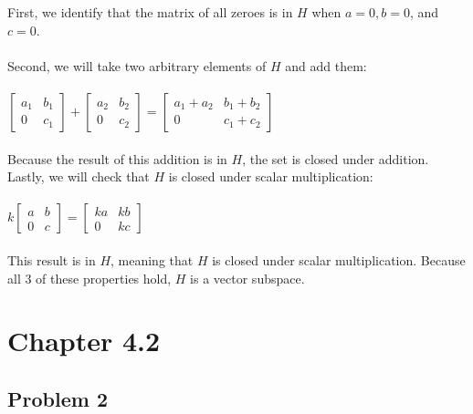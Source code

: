 \documentclass{article}%
\begin{document}
First, we identify that the matrix of all zeroes is in $H$ when $a = 0, b = 0$, and $c = 0$.\\
\\
Second, we will take two arbitrary elements of $H$ and add them:\\
\\
$
\begin{bmatrix}
    a_1 & b_1 \\
    0 & c_1
\end{bmatrix}
+
\begin{bmatrix}
    a_2 & b_2 \\
    0 & c_2
\end{bmatrix}
=
\begin{bmatrix}
    a_1 + a_2 & b_1 + b_2 \\
    0 & c_1 + c_2
\end{bmatrix}
$\\
\\
Because the result of this addition is in $H$, the set is closed under addition. Lastly, we will check that $H$ is closed under scalar multiplication:\\
\\
$
k
\begin{bmatrix}
    a & b \\
    0 & c
\end{bmatrix}
=
\begin{bmatrix}
    ka & kb \\
    0 & kc
\end{bmatrix}
$\\
\\
This result is in $H$, meaning that $H$ is closed under scalar multiplication. Because all 3 of these properties hold, $H$ is a vector subspace.


\section*{Chapter 4.2}

\subsection*{Problem 2}
\end{document}
